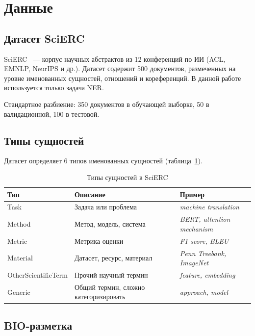 \section{Данные}

\subsection{Датасет SciERC}

SciERC~\cite{luan2018scierc} --- корпус научных абстрактов из 12 конференций по ИИ (ACL, EMNLP, NeurIPS и др.). Датасет содержит 500 документов, размеченных на уровне именованных сущностей, отношений и кореференций. В данной работе используется только задача NER.

Стандартное разбиение: 350 документов в обучающей выборке, 50 в валидационной, 100 в тестовой.

\subsection{Типы сущностей}

Датасет определяет 6 типов именованных сущностей (таблица~\ref{tab:entity_types}).

\begin{table}[h]
\centering
\caption{Типы сущностей в SciERC}
\label{tab:entity_types}
\begin{tabular}{lll}
\hline
\textbf{Тип} & \textbf{Описание} & \textbf{Пример} \\
\hline
Task               & Задача или проблема              & \textit{machine translation} \\
Method             & Метод, модель, система           & \textit{BERT, attention mechanism} \\
Metric             & Метрика оценки                   & \textit{F1 score, BLEU} \\
Material           & Датасет, ресурс, материал        & \textit{Penn Treebank, ImageNet} \\
OtherScientificTerm & Прочий научный термин           & \textit{feature, embedding} \\
Generic            & Общий термин, сложно категоризировать & \textit{approach, model} \\
\hline
\end{tabular}
\end{table}

\subsection{BIO-разметка}

